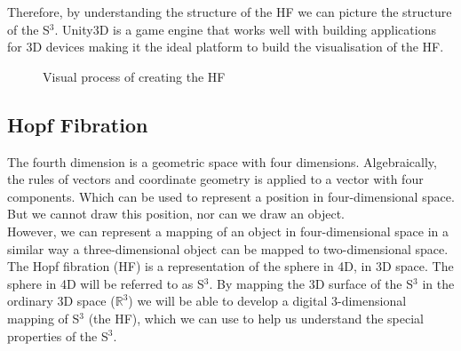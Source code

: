 \documentclass[12pt]{article} %
\begin{document}
\begin{flushleft}
Therefore, by understanding the structure of the HF we can picture the structure of the S$^{3}$. Unity3D is a game engine that works well with building applications for 3D devices making it the ideal platform to build the visualisation of the HF. 
 \begin{figure}[H] %
\caption{Visual process of creating the HF}
\label{fig:speciation}
\end{figure}
\subsection{Hopf Fibration} %
The fourth dimension is a geometric space with four dimensions. Algebraically, the rules of vectors and coordinate geometry is applied to a vector with four components. Which can be used to represent a position in four-dimensional space. But we cannot draw this position, nor can we draw an object.\\

However, we can represent a mapping of an object in four-dimensional space in a similar way a three-dimensional object can be mapped to two-dimensional space. The Hopf fibration (HF) is a representation of the sphere in 4D, in 3D space. The sphere in 4D will be referred to as S$^{3}$. By mapping the 3D surface of the S$^{3}$ in the ordinary 3D space ($\mathbb{R}^{3}$) we will be able to develop a digital 3-dimensional mapping of S$^{3}$ (the HF), which we can use to help us understand the special properties of the S$^{3}$.\\


\end{flushleft}
\end{document}
